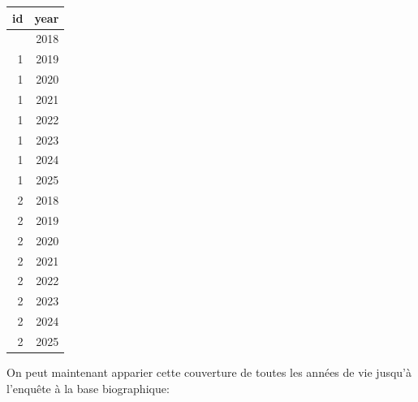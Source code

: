 \documentclass[
  12pt,
  letterpaper,
  DIV=11,
  numbers=noendperiod,
  onepage,
  openany]{scrreprt}
\newenvironment{Shaded}{\begin{snugshade}}{\end{snugshade}}
\newcommand{\AttributeTok}[1]{\textcolor[rgb]{0.80,0.80,0.80}{#1}}
\newcommand{\DecValTok}[1]{\textcolor[rgb]{0.86,0.86,0.80}{#1}}
\newcommand{\FunctionTok}[1]{\textcolor[rgb]{0.94,0.94,0.56}{#1}}
\newcommand{\NormalTok}[1]{\textcolor[rgb]{0.80,0.80,0.80}{#1}}
\newcommand{\OtherTok}[1]{\textcolor[rgb]{0.94,0.94,0.56}{#1}}
\newcommand{\SpecialCharTok}[1]{\textcolor[rgb]{0.86,0.64,0.64}{#1}}
\begin{document}
\begin{Shaded}
\end{Shaded}

\begin{longtable}[]{@{}rr@{}}
\toprule\noalign{}
id & year \\
\midrule\noalign{}
\endhead
\bottomrule\noalign{}
\endlastfoot
1 & 2018 \\
1 & 2019 \\
1 & 2020 \\
1 & 2021 \\
1 & 2022 \\
1 & 2023 \\
1 & 2024 \\
1 & 2025 \\
2 & 2018 \\
2 & 2019 \\
2 & 2020 \\
2 & 2021 \\
2 & 2022 \\
2 & 2023 \\
2 & 2024 \\
2 & 2025 \\
\end{longtable}

On peut maintenant apparier cette couverture de toutes les années de vie
jusqu'à l'enquête à la base biographique:
\end{document}
